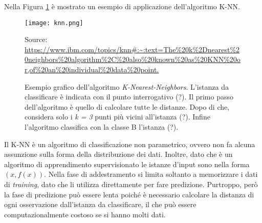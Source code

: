 Nella Figura \ref{fig:knn} è mostrato un esempio di applicazione dell'algoritmo K-NN.\\
\begin{figure}[h]
	\begin{center}
		\texttt{[image: knn.png]}
		\caption{Esempio grafico dell'algoritmo \emph{K-Nearest-Neighbors}.
			L'istanza da classificare è indicata con il punto interrogativo (?).
			Il primo passo dell'algoritmo è quello di calcolare tutte le distanze. Dopo di che, considera solo i \emph{k = 3} punti più vicini all'istanza (?). Infine l'algoritmo classifica con la classe B l'istanza (?).
		} 
		Source: \url{https://www.ibm.com/topics/knn#:~:text=The%20k%2Dnearest%20neighbors%20algorithm%2C%20also%20known%20as%20KNN%20or,of%20an%20individual%20data%20point.}\label{fig:knn}
	\end{center}
\end{figure}

Il K-NN è un algoritmo di classificazione non parametrico, ovvero non fa alcuna assunzione sulla forma della distribuzione dei dati. Inoltre, dato che è un algoritmo di apprendimento supervisionato le istanze d'input sono nella forma $(x, f(x))$. Nella fase di 
addestramento si limita soltanto a memorizzare i dati di \emph{training}, dato che li utilizza direttamente per fare predizione. Purtroppo, però la fase di predizione può essere lenta poiché è necessario calcolare la distanza di ogni osservazione dall'istanza da classificare, il che può essere computazionalmente costoso se si hanno molti dati.

